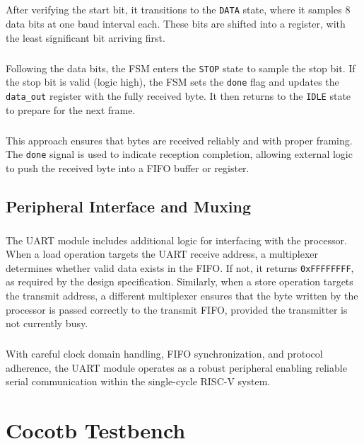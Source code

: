 \documentclass[12pt]{report}
\begin{document}
\paragraph{}
After verifying the start bit, it transitions to the \texttt{DATA} state, where it samples 8 data bits at one baud interval each. These bits are shifted into a register, with the least significant bit arriving first.

\paragraph{}
Following the data bits, the FSM enters the \texttt{STOP} state to sample the stop bit. If the stop bit is valid (logic high), the FSM sets the \texttt{done} flag and updates the \texttt{data\_out} register with the fully received byte. It then returns to the \texttt{IDLE} state to prepare for the next frame.

\paragraph{}
This approach ensures that bytes are received reliably and with proper framing. The \texttt{done} signal is used to indicate reception completion, allowing external logic to push the received byte into a FIFO buffer or register.

\section{Peripheral Interface and Muxing}

\paragraph{}
The UART module includes additional logic for interfacing with the processor. When a load operation targets the UART receive address, a multiplexer determines whether valid data exists in the FIFO. If not, it returns \texttt{0xFFFFFFFF}, as required by the design specification. Similarly, when a store operation targets the transmit address, a different multiplexer ensures that the byte written by the processor is passed correctly to the transmit FIFO, provided the transmitter is not currently busy.

\paragraph{}
With careful clock domain handling, FIFO synchronization, and protocol adherence, the UART module operates as a robust peripheral enabling reliable serial communication within the single-cycle RISC-V system.

\chapter{Cocotb Testbench}
\end{document}
